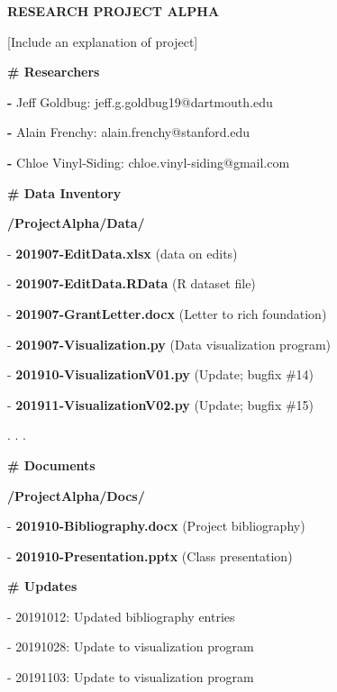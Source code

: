 \begin{center}
\begin{tcolorbox}[colframe=oyster, coltitle=black, sharp corners, title=README.md]

\textbf{RESEARCH PROJECT ALPHA}

\medskip

[Include an explanation of project]

\medskip

\textbf{\# Researchers}

\textbf{-} Jeff Goldbug: {\color{green}jeff.g.goldbug19@dartmouth.edu}

\textbf{-} Alain Frenchy: {\color{green}alain.frenchy@stanford.edu}

\textbf{-} Chloe Vinyl-Siding: {\color{green}chloe.vinyl-siding@gmail.com}

\medskip

\textbf{\# Data Inventory}

\smallskip

{\color{green}\textbf{/ProjectAlpha/Data/}}

- \textbf{201907-EditData.xlsx} (data on edits)

- \textbf{201907-EditData.RData} (R dataset file)

- \textbf{201907-GrantLetter.docx} (Letter to rich foundation)

- \textbf{201907-Visualization.py} (Data visualization program)

- \textbf{201910-VisualizationV01.py} (Update; bugfix \#14)

- \textbf{201911-VisualizationV02.py} (Update; bugfix \#15)

. . . \medskip

\textbf{\# Documents}

{\color{green}\textbf{/ProjectAlpha/Docs/}}

- \textbf{201910-Bibliography.docx} (Project bibliography)

- \textbf{201910-Presentation.pptx} (Class presentation)

\medskip

\textbf{\# Updates}

- 20191012: Updated bibliography entries

- 20191028: Update to visualization program

- 20191103: Update to visualization program

\end{tcolorbox}

\end{center}

